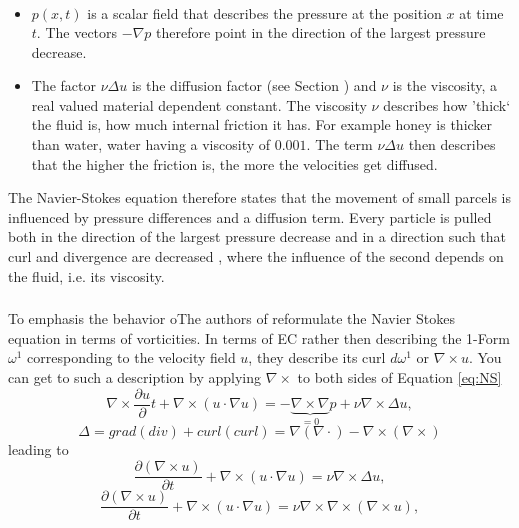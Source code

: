 \begin{itemize}
\begin{align*}
	\end{align*}
	\item $p(x,t)$ is a scalar field that describes the pressure at the position $x$ at time $t$. The vectors $-\nabla p$ therefore point in the direction of the largest pressure decrease.
	\item The factor $\nu \Delta u$ is the diffusion factor (see Section ) and $\nu$ is the viscosity, a real valued material dependent constant. The viscosity $\nu$ describes how 'thick` the fluid is, how much internal friction it has. For example honey is thicker than water, water having a viscosity of $0.001$. The term $\nu \Delta u$ then describes that the higher the friction is, the more the velocities get diffused.
\end{itemize}

The Navier-Stokes equation therefore states that the movement of small parcels is influenced by pressure differences and a diffusion term. Every particle is pulled both in the direction of the largest pressure decrease and in a direction such that curl and divergence are decreased , where the influence of the second depends on the fluid, i.e. its viscosity.

\subsubsection*{}
To emphasis the behavior oThe authors of  reformulate the Navier Stokes equation in terms of vorticities. In terms of EC rather then describing the 1-Form $\omega^1$ corresponding to the velocity field $u$, they describe its curl $d\omega^1$ or $ \nabla \times u$. You can get to such a description by applying $\nabla \times$ to both sides of Equation \ref{eq:NS}
\[\nabla \times \frac{\partial u} \partial{t} + \nabla \times (u \cdot \nabla u) = - \underbrace{\nabla\times \nabla}_{=0} p + \nu \nabla \times \Delta u,\]
\[\Delta = grad(div) + curl(curl) = \nabla(\nabla \cdot) - \nabla \times (\nabla \times) \]
leading to
\[\frac{\partial (\nabla \times u)}{\partial t} + \nabla \times (u \cdot \nabla u) =  \nu \nabla \times \Delta u,\]
\[\frac{\partial (\nabla \times u)}{\partial t} + \nabla \times (u \cdot \nabla u) =  \nu \nabla \times \nabla \times (\nabla \times u),\]


